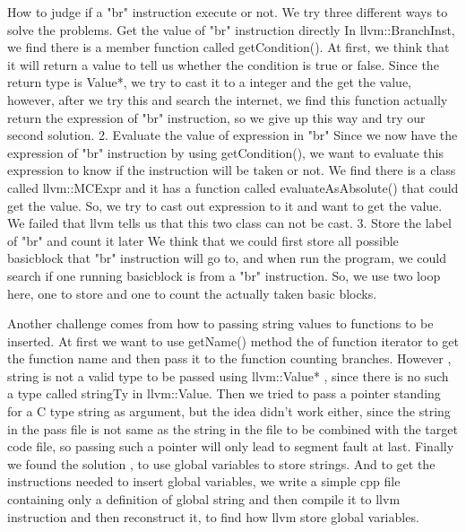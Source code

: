 \documentclass[11pt]{article}
\begin{document}
How to judge if a {"br"} instruction execute or not.
We try three different ways to solve the problems.
	 Get the value of {"br"} instruction directly
		In llvm::BranchInst, we find there is a member function called getCondition(). At first, we think that it will return a value to tell us whether the condition is true or false. Since the return type is Value*, we try to cast it to a integer and the get the value, however, after we try this and search the internet, we find this function actually return the expression of {"br"} instruction, so we give up this way and try our second solution.
	2. Evaluate the value of expression in {"br"}
		Since we now have the expression of {"br"}  instruction by using getCondition(), we want to evaluate this expression to know if the instruction will be taken or not. We find there is a class called llvm::MCExpr and it has a function called evaluateAsAbsolute() that could get the value. So, we try to cast out expression to it and want to get the value. We failed that llvm tells us that this two class can not be cast.
	3. Store the label of {"br"} and count it later
		We think that we could first store all possible basicblock that {"br"} instruction will go to, and when run the program, we could search if one running basicblock is from a {"br"} instruction. So, we use two loop here, one to store and one to count the actually taken basic blocks.

Another challenge comes from how to passing string values to functions to be inserted. At first we want to use getName() method the of function iterator to get the function name and then pass it to the function counting branches. However , string is not a valid type to be passed using llvm::Value* , since there is no such a type called stringTy in llvm::Value. Then we tried to pass a pointer standing for a C type string as argument, but the idea {didn't} work either, since the string in the pass file is not same as the string in the file to be combined with the target code file, so passing such a pointer will only lead to segment fault at last. Finally we found the solution , to use global variables to store strings. And to get the instructions needed to insert global variables, we write a simple cpp file containing only a definition of global string and then compile it to llvm instruction and then reconstruct it, to find how llvm store global variables.
\end{document}
